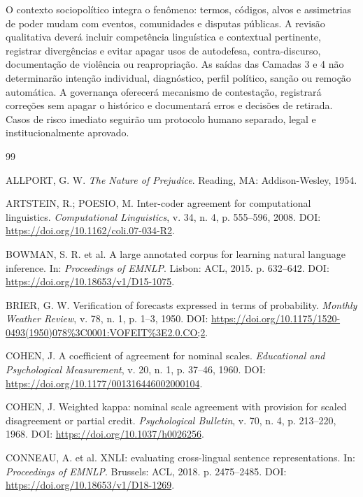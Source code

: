 O contexto sociopolítico integra o fenômeno: termos, códigos, alvos e assimetrias de poder mudam com eventos, comunidades e disputas públicas. A revisão qualitativa deverá incluir competência linguística e contextual pertinente, registrar divergências e evitar apagar usos de autodefesa, contra-discurso, documentação de violência ou reapropriação. As saídas das Camadas 3 e 4 não determinarão intenção individual, diagnóstico, perfil político, sanção ou remoção automática. A governança oferecerá mecanismo de contestação, registrará correções sem apagar o histórico e documentará erros e decisões de retirada. Casos de risco imediato seguirão um protocolo humano separado, legal e institucionalmente aprovado.

\begin{thebibliography}{99}

ALLPORT, G. W. \emph{The Nature of Prejudice}. Reading, MA: Addison-Wesley, 1954.

ARTSTEIN, R.; POESIO, M. Inter-coder agreement for computational linguistics. \emph{Computational Linguistics}, v. 34, n. 4, p. 555--596, 2008. DOI: \url{https://doi.org/10.1162/coli.07-034-R2}.

BOWMAN, S. R. et al. A large annotated corpus for learning natural language inference. In: \emph{Proceedings of EMNLP}. Lisbon: ACL, 2015. p. 632--642. DOI: \url{https://doi.org/10.18653/v1/D15-1075}.

BRIER, G. W. Verification of forecasts expressed in terms of probability. \emph{Monthly Weather Review}, v. 78, n. 1, p. 1--3, 1950. DOI: \url{https://doi.org/10.1175/1520-0493(1950)078\%3C0001:VOFEIT\%3E2.0.CO;2}.

COHEN, J. A coefficient of agreement for nominal scales. \emph{Educational and Psychological Measurement}, v. 20, n. 1, p. 37--46, 1960. DOI: \url{https://doi.org/10.1177/001316446002000104}.

COHEN, J. Weighted kappa: nominal scale agreement with provision for scaled disagreement or partial credit. \emph{Psychological Bulletin}, v. 70, n. 4, p. 213--220, 1968. DOI: \url{https://doi.org/10.1037/h0026256}.

CONNEAU, A. et al. XNLI: evaluating cross-lingual sentence representations. In: \emph{Proceedings of EMNLP}. Brussels: ACL, 2018. p. 2475--2485. DOI: \url{https://doi.org/10.18653/v1/D18-1269}.


\end{thebibliography}

